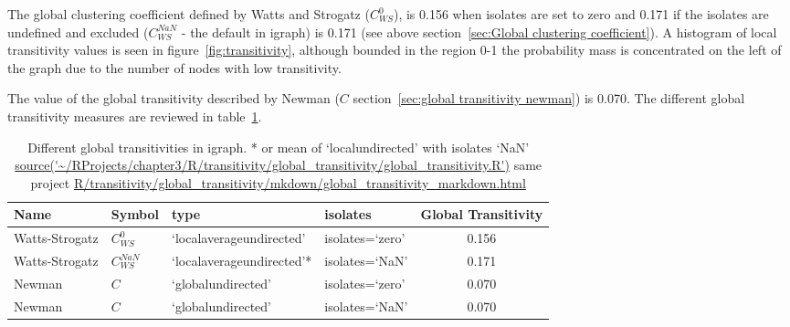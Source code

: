 The global clustering coefficient defined by Watts and Strogatz ($C_{WS}^0$),  is 0.156 when isolates are set to zero\cite{watts1998collective} and 0.171 if the isolates are undefined and excluded ($C_{WS}^{NaN}$ - the default in igraph) is 0.171 (see above section~\ref{sec:Global clustering coefficient}). A histogram of local transitivity values is seen in figure~\ref{fig:transitivity}, although bounded in the region 0-1 the probability mass is concentrated on the left of the graph due to the number of nodes with low transitivity.

 The value of the global transitivity described by Newman ($C$ section~\ref{sec:global transitivity newman}) is 0.070. The different global transitivity measures are reviewed in table~\ref{tab:Different global transitivities in igraph}.


\begin{table}[ht]
\centering

\begin{adjustbox}{width=\textwidth}
\begin{tabular}{llllc}
  \toprule
Name & Symbol &  type & isolates & Global Transitivity \\ 
  \midrule
Watts-Strogatz & $C_{WS}^{0}$& `localaverageundirected'
 &isolates=`zero' & 0.156\vspace{1mm} \\ 

Watts-Strogatz & $C_{WS}^{NaN}$ &`localaverageundirected'*&isolates=`NaN' & 0.171\vspace{1mm} \\ 
  Newman &$C$&`globalundirected' &isolates=`zero'& 0.070\vspace{1mm} \\ 
  Newman &$C$&`globalundirected'&isolates=`NaN'& 0.070 \\ 
   \bottomrule
\end{tabular}
\end{adjustbox}
\caption[Different global transitivities in igraph]{Different global transitivities in igraph. * or mean of `localundirected' with isolates `NaN' 
\tiny\url{source('~/RProjects/chapter3/R/transitivity/global_transitivity/global_transitivity.R')} 
\tiny same project \url{R/transitivity/global_transitivity/mkdown/global_transitivity_markdown.html}} 
\label{tab:Different global transitivities in igraph}
\end{table}


